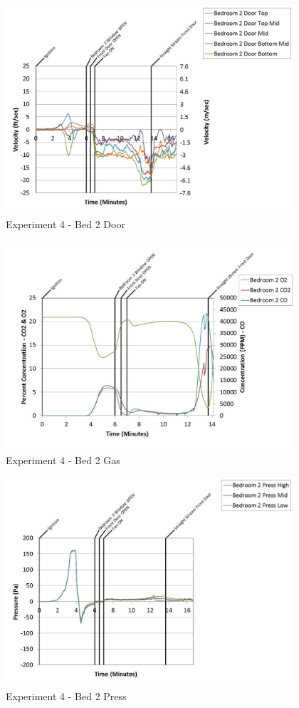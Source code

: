 \documentclass{article}
\begin{document}
\begin{appendices}
	\begin{figure}[h!]
		\centering
		\includegraphics[height=3.05in]{0_Images/Results_Charts/Exp_4_Charts/Bed2Door.pdf}
		\caption{Experiment 4 - Bed 2 Door}
	\end{figure}
 
	\clearpage

	\begin{figure}[h!]
		\centering
		\includegraphics[height=3.05in]{0_Images/Results_Charts/Exp_4_Charts/Bed2Gas.pdf}
		\caption{Experiment 4 - Bed 2 Gas}
	\end{figure}
 

	\begin{figure}[h!]
		\centering
		\includegraphics[height=3.05in]{0_Images/Results_Charts/Exp_4_Charts/Bed2Press.pdf}
		\caption{Experiment 4 - Bed 2 Press}
	\end{figure}
 

\end{appendices}
\end{document}
